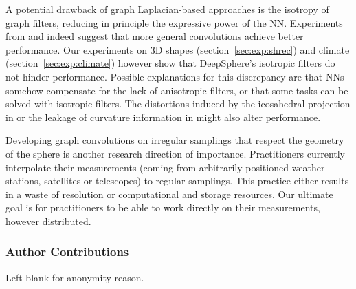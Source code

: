 \documentclass{article} %
\newcommand{\todo}[1]{{\color[rgb]{.6,.1,.6}{#1}}}
\newcommand{\secref}[1]{section~\ref{sec:#1}}
\begin{document}
A potential drawback of graph Laplacian-based approaches is the isotropy of graph filters, reducing in principle the expressive power of the NN.
Experiments from \citet{cohen2019gauge} and \citet{boscaini2016anisotropicgraphnn} indeed suggest that more general convolutions achieve better performance.
Our experiments on 3D shapes (\secref{exp:shrec}) and climate (\secref{exp:climate}) however show that DeepSphere's isotropic filters do not hinder performance.
Possible explanations for this discrepancy are that NNs somehow compensate for the lack of anisotropic filters, or that some tasks can be solved with isotropic filters.
The distortions induced by the icosahedral projection in \citep{cohen2019gauge} or the leakage of curvature information in \citep{boscaini2016anisotropicgraphnn} might also alter performance.

Developing graph convolutions on irregular samplings that respect the geometry of the sphere is another research direction of importance.
Practitioners currently interpolate their measurements (coming from arbitrarily positioned weather stations, satellites or telescopes) to regular samplings.
This practice either results in a waste of resolution or computational and storage resources.
Our ultimate goal is for practitioners to be able to work directly on their measurements, however distributed.



\newpage
\subsubsection*{Author Contributions}
Left blank for anonymity reason.
\end{document}

